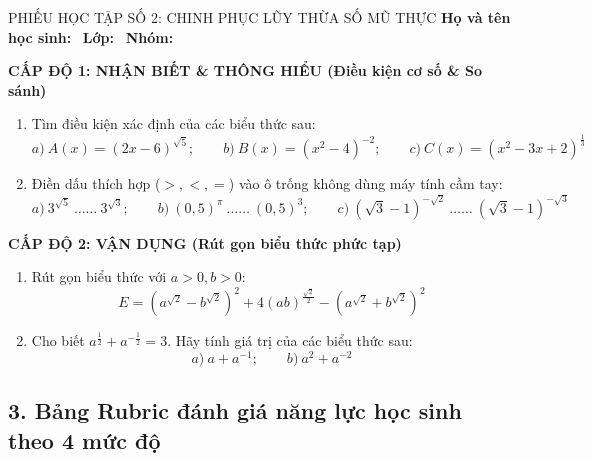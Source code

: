 \documentclass[12pt, a4paper]{article}
\begin{document}
\begin{pedabox}{PHIẾU HỌC TẬP SỐ 2: CHINH PHỤC LŨY THỪA SỐ MŨ THỰC}
\textbf{Họ và tên học sinh:} \dotfill \ \textbf{Lớp:} \dotfill \ \textbf{Nhóm:} \dotfill

\noindent \textbf{CẤP ĐỘ 1: NHẬN BIẾT \& THÔNG HIỂU (Điều kiện cơ số \& So sánh)}
\begin{enumerate}[leftmargin=0.6cm]
    \item Tìm điều kiện xác định của các biểu thức sau:
    $$a) \ A(x) = (2x - 6)^{\sqrt{5}}; \qquad b) \ B(x) = (x^2 - 4)^{-2}; \qquad c) \ C(x) = (x^2 - 3x + 2)^{\frac{1}{3}}$$
    \item Điền dấu thích hợp ($>, <, =$) vào ô trống không dùng máy tính cầm tay:
    $$a) \ 3^{\sqrt{5}} \ \dots\dots \ 3^{\sqrt{3}}; \qquad b) \ (0{,}5)^{\pi} \ \dots\dots \ (0{,}5)^{3}; \qquad c) \ (\sqrt{3} - 1)^{-\sqrt{2}} \ \dots\dots \ (\sqrt{3} - 1)^{-\sqrt{3}}$$
\end{enumerate}

\noindent \textbf{CẤP ĐỘ 2: VẬN DỤNG (Rút gọn biểu thức phức tạp)}
\begin{enumerate}[leftmargin=0.6cm]
    \item Rút gọn biểu thức với $a > 0, b > 0$:
    $$E = \left(a^{\sqrt{2}} - b^{\sqrt{2}}\right)^2 + 4(ab)^{\frac{\sqrt{2}}{2}} - (a^{\sqrt{2}} + b^{\sqrt{2}})^2$$
    \item Cho biết $a^{\frac{1}{2}} + a^{-\frac{1}{2}} = 3$. Hãy tính giá trị của các biểu thức sau:
    $$a) \ a + a^{-1}; \qquad b) \ a^2 + a^{-2}$$
\end{enumerate}
\end{pedabox}

\subsection*{3. Bảng Rubric đánh giá năng lực học sinh theo 4 mức độ}
\end{document}
